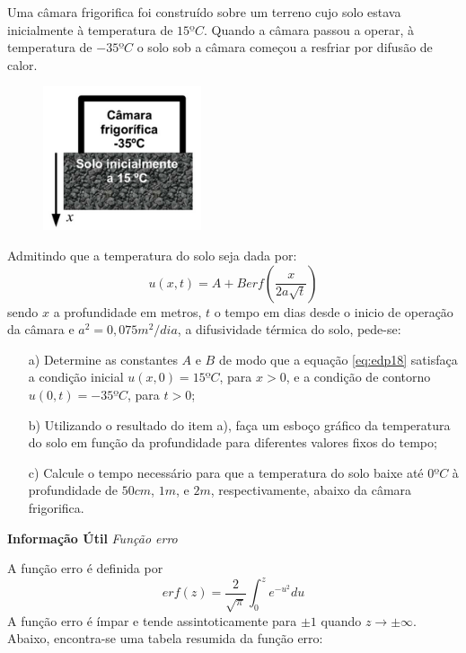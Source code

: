 \linespread{1.5}

Uma câmara frigorifica foi construído sobre um terreno cujo solo estava inicialmente à temperatura de $15ºC$. Quando a câmara passou a operar, à temperatura de $-35ºC$ o solo sob a câmara começou a resfriar por difusão de calor.
\begin{figure}[H]
    \centering
    \includegraphics[width=0.3\linewidth]{fig/edp18.png}
    \label{fig:edp18}
\end{figure}
Admitindo que a temperatura do solo seja dada por:
\begin{equation}
\label{eq:edp18}
    u(x,t) = A + Berf\left(\frac{x}{2a\sqrt{t}}\right)
\end{equation}
sendo $x$ a profundidade em metros, $t$ o tempo em dias desde o inicio de operação da câmara e $a^2 = 0,075m^2/dia$, a difusividade térmica do solo, pede-se:
\begin{itemize}
    \item[a)] Determine as constantes $A$ e $B$ de modo que a equação \ref{eq:edp18} satisfaça a condição inicial $u(x,0) = 15ºC$, para $x>0$, e a condição de contorno $u(0,t) = -35ºC$, para $t>0$;
    \item[b)] Utilizando o resultado do item a), faça um esboço gráfico da temperatura do solo em função da profundidade para diferentes valores fixos do tempo;
    \item[c)]Calcule o tempo necessário para que a temperatura do solo baixe até $0ºC$ à profundidade de $50cm$, $1m$, e $2m$, respectivamente, abaixo da câmara frigorifica.
\end{itemize}
\begin{center}
        \textbf{Informação Útil}
        \textit{Função erro}
\end{center}
A função erro é definida por 
\begin{equation*}
    erf(z) = \frac{2}{\sqrt{\pi}}\int_0^z e^{-u^2}du
\end{equation*}
A função erro é ímpar e tende assintoticamente para $\pm1$ quando $z\rightarrow\pm\infty$. Abaixo, encontra-se uma tabela resumida da função erro:
